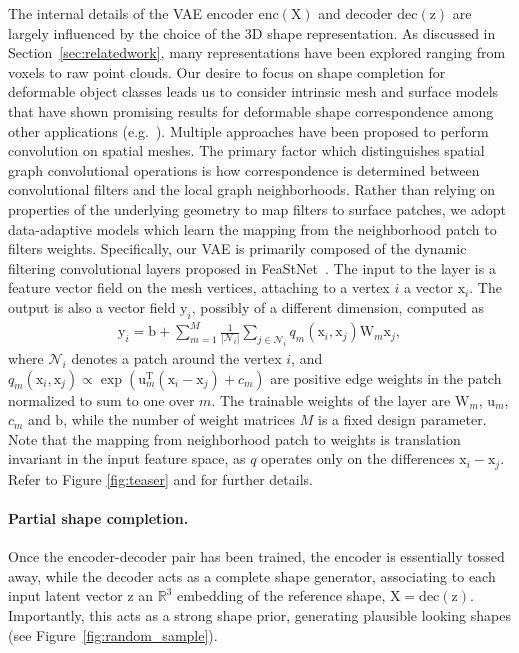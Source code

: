 \documentclass[10pt,twocolumn,letterpaper]{article}
\newcommand{\bb}[1]{\bm{\mathrm{#1}}}
\begin{document}
The internal details of the VAE encoder $\mathrm{enc}(\bb{X})$ and decoder $\mathrm{dec}(\bb{z})$ are largely influenced by the choice of the 3D shape representation. As discussed in Section~\ref{sec:relatedwork}, many representations have been explored ranging from voxels to raw point clouds. Our desire to focus on shape completion for deformable object classes leads us to consider intrinsic mesh and surface models that have shown promising results for deformable shape correspondence among other applications (e.g.~\cite{masci15,monet}). Multiple approaches have been proposed to perform convolution on spatial meshes. The primary factor which distinguishes spatial graph convolutional operations is how correspondence is determined between convolutional filters and the local graph neighborhoods. Rather than relying on properties of the underlying geometry to map filters to surface patches, we adopt data-adaptive models which learn the mapping from the neighborhood patch to filters weights. Specifically, our VAE is primarily composed of the dynamic filtering convolutional layers proposed in FeaStNet~\cite{dynFilt}. The input to the layer is a feature vector field on the mesh vertices, attaching to a vertex $i$ a vector $\bb{x}_i$. The output is also a vector field $\bb{y}_i$, possibly of a different dimension, computed as  
\begin{align}\label{eq:filt}
\bb{y}_i = \bb{b} + \sum_{m=1}^{M} \frac{1}{|\mathcal{N}_i|} \sum_{j\in \mathcal{N}_i} q_m(\bb{x}_i, \bb{x}_j) \bb{W}_m \bb{x}_j,
\end{align}
where $\mathcal{N}_i$ denotes a patch around the vertex $i$, and 
$q_m(\bb{x}_i, \bb{x}_j) \propto \exp (\bb{u}_m^\mathrm{T} (\bb{x}_i - \bb{x}_j) + c_m)$
are positive edge weights in the patch normalized to sum to one over $m$.
%
The trainable weights of the layer are $\bb{W}_m$, $\bb{u}_m$, $c_m$ and $\bb{b}$, while the number of weight matrices $M$ is a fixed design parameter. Note that the mapping from neighborhood patch to weights is translation invariant in the input feature space, as $q$ operates only on the differences $\bb{x}_i-\bb{x}_j$. Refer to Figure \ref{fig:teaser} and \cite{dynFilt} for further details.

\paragraph{Partial shape completion.}
Once the encoder-decoder pair has been trained, the encoder is essentially tossed away, while the decoder acts as a complete shape generator, associating to each input latent vector $\bb{z}$ an $\mathbb{R}^3$ embedding of the reference shape, $\bb{X} = \mathrm{dec}(\bb{z})$. Importantly, this acts as a strong shape prior, generating plausible looking shapes (see Figure~\ref{fig:random_sample}).
\end{document}
